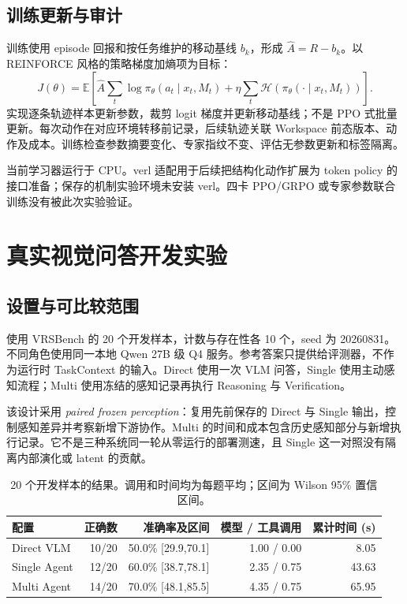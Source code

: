 \documentclass[UTF8,a4paper,zihao=5,fontset=fandol]{ctexart}
\begin{document}
\subsection{训练更新与审计}
训练使用 episode 回报和按任务维护的移动基线 $b_k$，形成 $\hat A=R-b_k$。以 REINFORCE 风格的策略梯度加熵项为目标\cite{reinforce}：
\begin{equation}
J(\theta)=\mathbb E\!\left[\hat A\sum_t\log\pi_\theta(a_t\mid x_t,M_t)
+\eta\sum_t\mathcal H(\pi_\theta(\cdot\mid x_t,M_t))\right].
\end{equation}
实现逐条轨迹样本更新参数，裁剪 logit 梯度并更新移动基线；不是 PPO 式批量更新。每次动作在对应环境转移前记录，后续轨迹关联 Workspace 前态版本、动作及成本。训练检查参数摘要变化、专家指纹不变、评估无参数更新和标签隔离。

当前学习器运行于 CPU。verl 适配用于后续把结构化动作扩展为 token policy 的接口准备；保存的机制实验环境未安装 verl。四卡 PPO/GRPO 或专家参数联合训练没有被此次实验验证。

\newpage
\section{真实视觉问答开发实验}
\subsection{设置与可比较范围}
使用 VRSBench 的 20 个开发样本，计数与存在性各 10 个，seed 为 20260831。不同角色使用同一本地 Qwen 27B 级 Q4 服务。参考答案只提供给评测器，不作为运行时 TaskContext 的输入。Direct 使用一次 VLM 问答，Single 使用主动感知流程；Multi 使用冻结的感知记录再执行 Reasoning 与 Verification。

该设计采用 \emph{paired frozen perception}：复用先前保存的 Direct 与 Single 输出，控制感知差异并考察新增下游协作。Multi 的时间和成本包含历史感知部分与新增执行记录。它不是三种系统同一轮从零运行的部署测速，且 Single 这一对照没有隔离内部演化或 latent 的贡献。

\begin{table}[h]
\centering\small
\caption{20 个开发样本的结果。调用和时间均为每题平均；区间为 Wilson 95\% 置信区间。}
\begin{tabularx}{\textwidth}{Yrrrr}
\toprule
配置 & 正确数 & 准确率及区间 & 模型 / 工具调用 & 累计时间 (s)\\
\midrule
Direct VLM & 10/20 & 50.0\% [29.9,70.1] & 1.00 / 0.00 & 8.05\\
Single Agent & 12/20 & 60.0\% [38.7,78.1] & 2.35 / 0.75 & 43.63\\
Multi Agent & 14/20 & 70.0\% [48.1,85.5] & 4.35 / 0.75 & 65.95\\
\bottomrule
\end{tabularx}
\label{tab:main}
\end{table}
\end{document}
